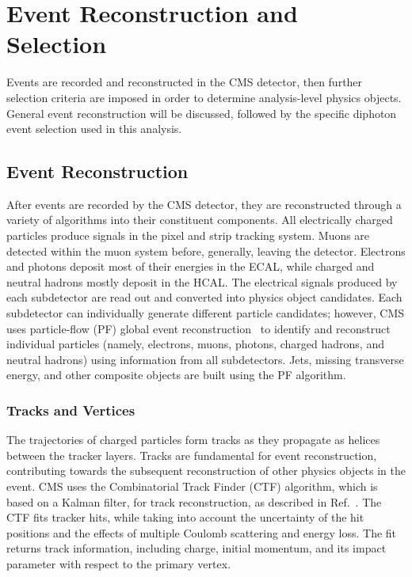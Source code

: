 \chapter{Event Reconstruction and Selection}\label{ch:event_selection}

Events are recorded and reconstructed in the CMS detector, then further selection criteria are imposed in order to determine analysis-level physics objects. General event reconstruction will be discussed, followed by the specific diphoton event selection used in this analysis.


\section{Event Reconstruction}\label{sec:event_reco}

After events are recorded by the CMS detector, they are reconstructed through a variety of algorithms into their constituent components. All electrically charged particles produce signals in the pixel and strip tracking system. Muons are detected within the muon system before, generally, leaving the detector. Electrons and photons deposit most of their energies in the ECAL, while charged and neutral hadrons mostly deposit in the HCAL. The electrical signals produced by each subdetector are read out and converted into physics object candidates. Each subdetector can individually generate different particle candidates; however, CMS uses particle-flow (PF) global event reconstruction~\cite{CMS-PRF-14-001} to identify and reconstruct individual particles (namely, electrons, muons, photons, charged hadrons, and neutral hadrons) using information from all subdetectors. Jets, missing transverse energy, and other composite objects are built using the PF algorithm.

\subsection{Tracks and Vertices}\label{sec:track_vertex}

The trajectories of charged particles form tracks as they propagate as helices between the tracker layers. Tracks are fundamental for event reconstruction, contributing towards the subsequent reconstruction of other physics objects in the event. CMS uses the Combinatorial Track Finder (CTF) algorithm, which is based on a Kalman filter, for track reconstruction, as described in Ref.~\cite{Chatrchyan:2014fea}. The CTF fits tracker hits, while taking into account the uncertainty of the hit positions and the effects of multiple Coulomb scattering and energy loss. The fit returns track information, including charge, initial momentum, and its impact parameter with respect to the primary vertex.

